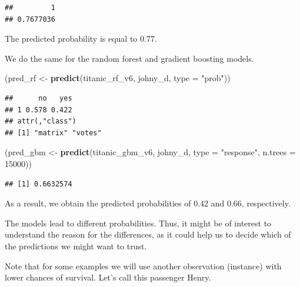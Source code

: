 \documentclass[12pt,]{krantz}
\newenvironment{Shaded}{\begin{snugshade}}{\end{snugshade}}
\newcommand{\DataTypeTok}[1]{\textcolor[rgb]{0.13,0.29,0.53}{#1}}
\newcommand{\DecValTok}[1]{\textcolor[rgb]{0.00,0.00,0.81}{#1}}
\newcommand{\KeywordTok}[1]{\textcolor[rgb]{0.13,0.29,0.53}{\textbf{#1}}}
\newcommand{\NormalTok}[1]{#1}
\newcommand{\StringTok}[1]{\textcolor[rgb]{0.31,0.60,0.02}{#1}}
\begin{document}
\begin{verbatim}
##         1 
## 0.7677036
\end{verbatim}

The predicted probability is equal to 0.77.

We do the same for the random forest and gradient boosting models.

\begin{Shaded}
\begin{Highlighting}[]
\NormalTok{(pred_rf <-}\StringTok{ }\KeywordTok{predict}\NormalTok{(titanic_rf_v6, johny_d, }\DataTypeTok{type =} \StringTok{"prob"}\NormalTok{))}
\end{Highlighting}
\end{Shaded}

\begin{verbatim}
##      no   yes
## 1 0.578 0.422
## attr(,"class")
## [1] "matrix" "votes"
\end{verbatim}

\begin{Shaded}
\begin{Highlighting}[]
\NormalTok{(pred_gbm <-}\StringTok{ }\KeywordTok{predict}\NormalTok{(titanic_gbm_v6, johny_d, }\DataTypeTok{type =} \StringTok{"response"}\NormalTok{, }\DataTypeTok{n.trees =} \DecValTok{15000}\NormalTok{))}
\end{Highlighting}
\end{Shaded}

\begin{verbatim}
## [1] 0.6632574
\end{verbatim}

As a result, we obtain the predicted probabilities of 0.42 and 0.66, respectively.

The models lead to different probabilities. Thus, it might be of interest to understand the reason for the differences, as it could help us to decide which of the predictions we might want to trust.

Note that for some examples we will use another observation (instance) with lower chances of survival. Let's call this passenger Henry.
\end{document}
